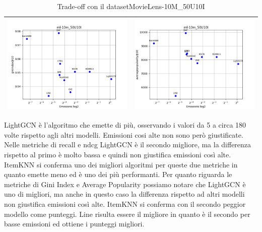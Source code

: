 \begin{table}[H]
\begin{tabularx}{\textwidth}{|X|X|}
        \includegraphics[width=\linewidth, trim=0 0 0 0]{images/giniindex@10_ml-10m_50U10I.png} &
        \includegraphics[width=\linewidth, trim=0 0 0 0]{images/averagepopularity@10_ml-10m_50U10I.png} \\
        \hline
    \end{tabularx}
    \caption{Trade-off con il datasetMovieLens-10M\_50U10I}
    \label{tab:emissions_info}
\end{table}


\noindent LightGCN è l'algoritmo che emette di più, osservando i valori da 5 a circa 180 volte rispetto agli altri modelli.
Emissioni cosi alte non sono però giustificate. Nelle metriche di recall e ndcg LightGCN è il secondo migliore, ma la differenza rispetto al primo è molto bassa e quindi non giustifica emissioni così alte.
ItemKNN si conferma uno dei migliori algoritmi per queste due metriche in quanto emette meno ed è uno dei più performanti.
Per quanto riguarda le metriche di Gini Index e Average Popularity possiamo notare che LightGCN è uno di migliori, ma anche in questo caso la differenza rispetto ad altri modelli non giustifica emissioni così alte. ItemKNN si conferma con il secondo peggior modello come punteggi. Line risulta essere il migliore in quanto è il secondo per basse emissioni ed ottiene i punteggi migliori. 


